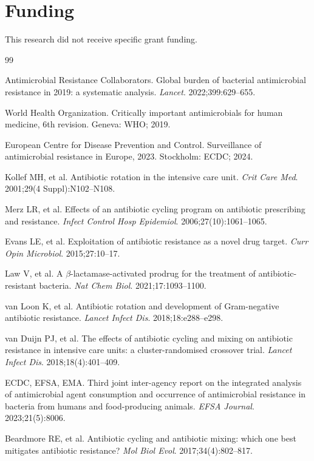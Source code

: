 \documentclass[12pt,a4paper]{article}
\begin{document}
\section*{Funding}

This research did not receive specific grant funding.

\begin{thebibliography}{99}

Antimicrobial Resistance Collaborators.
Global burden of bacterial antimicrobial resistance in 2019: a systematic analysis.
\textit{Lancet}. 2022;399:629--655.

World Health Organization.
Critically important antimicrobials for human medicine, 6th revision.
Geneva: WHO; 2019.

European Centre for Disease Prevention and Control.
Surveillance of antimicrobial resistance in Europe, 2023.
Stockholm: ECDC; 2024.

Kollef MH, et al.
Antibiotic rotation in the intensive care unit.
\textit{Crit Care Med}. 2001;29(4 Suppl):N102--N108.

Merz LR, et al.
Effects of an antibiotic cycling program on antibiotic prescribing and resistance.
\textit{Infect Control Hosp Epidemiol}. 2006;27(10):1061--1065.

Evans LE, et al.
Exploitation of antibiotic resistance as a novel drug target.
\textit{Curr Opin Microbiol}. 2015;27:10--17.

Law V, et al.
A $\beta$-lactamase-activated prodrug for the treatment of antibiotic-resistant bacteria.
\textit{Nat Chem Biol}. 2021;17:1093--1100.

van Loon K, et al.
Antibiotic rotation and development of Gram-negative antibiotic resistance.
\textit{Lancet Infect Dis}. 2018;18:e288--e298.

van Duijn PJ, et al.
The effects of antibiotic cycling and mixing on antibiotic resistance in intensive care units: a cluster-randomised crossover trial.
\textit{Lancet Infect Dis}. 2018;18(4):401--409.

ECDC, EFSA, EMA.
Third joint inter-agency report on the integrated analysis of antimicrobial agent consumption and occurrence of antimicrobial resistance in bacteria from humans and food-producing animals.
\textit{EFSA Journal}. 2023;21(5):8006.

Beardmore RE, et al.
Antibiotic cycling and antibiotic mixing: which one best mitigates antibiotic resistance?
\textit{Mol Biol Evol}. 2017;34(4):802--817.


\end{thebibliography}
\end{document}
